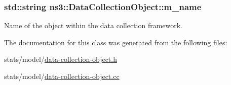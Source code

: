 \subsubsection[{\texorpdfstring{m\+\_\+name}{m_name}}]{\setlength{\rightskip}{0pt plus 5cm}std\+::string ns3\+::\+Data\+Collection\+Object\+::m\+\_\+name\hspace{0.3cm}{\ttfamily [protected]}}\hypertarget{classns3_1_1DataCollectionObject_a06696e9fa95aeeeb6bd84b35ef8e6f40}{}\label{classns3_1_1DataCollectionObject_a06696e9fa95aeeeb6bd84b35ef8e6f40}


Name of the object within the data collection framework. 



The documentation for this class was generated from the following files\+:\begin{DoxyCompactItemize}
\item 
stats/model/\hyperlink{data-collection-object_8h}{data-\/collection-\/object.\+h}\item 
stats/model/\hyperlink{data-collection-object_8cc}{data-\/collection-\/object.\+cc}\end{DoxyCompactItemize}
